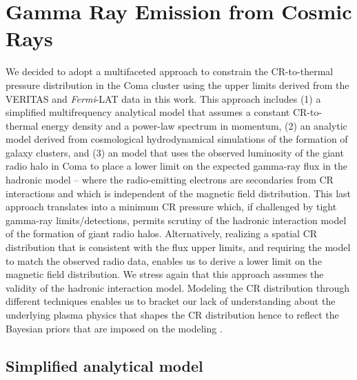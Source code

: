 \documentclass[12pt,manuscript]{aastex}
\def\Fermi{{\em Fermi}\xspace}
\begin{document}
\section{Gamma Ray Emission from Cosmic Rays}
We decided to adopt a multifaceted approach to constrain the CR-to-thermal pressure distribution in
the Coma cluster using the upper limits derived from the VERITAS and \Fermi-LAT data in this work.
This approach includes (1) a simplified multifrequency analytical model that assumes a constant
CR-to-thermal energy density and a power-law spectrum in momentum, (2) an analytic model derived
from cosmological hydrodynamical simulations of the formation of galaxy clusters, and (3) an
model that uses the observed luminosity of the giant radio halo in Coma to place a lower limit on
the expected gamma-ray flux in the hadronic model -- where the radio-emitting electrons are
secondaries from CR interactions and which is independent of the magnetic field distribution.  This
last approach translates into a minimum CR pressure which, if challenged by tight gamma-ray
limits/detections, permits scrutiny of the hadronic interaction model of the formation of giant
radio halos. Alternatively, realizing a spatial CR distribution that is consistent with the flux
upper limits, and requiring the model to match the observed radio data, enables us to derive a
lower limit on the magnetic field distribution. We stress again that this approach assumes the
validity of the hadronic interaction model. Modeling the CR distribution through different
techniques enables us to bracket our lack of understanding about the underlying plasma physics that
shapes the CR distribution hence to reflect the Bayesian priors that are imposed on the modeling
\citep[see][for a discussion]{article:PinzkePfrommerBergstrom}.

%
%

\subsection{Simplified analytical model}
\label{sec:simple}
\end{document}
